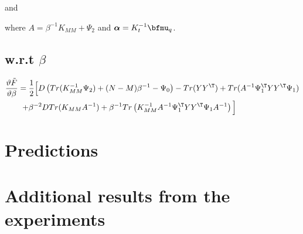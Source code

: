 and



\noindent where $A=\beta^{-1}K_{MM}+\Psi_2$ and $\boldsymbol \alpha = K_t^{-1} \bfmu_q$.

\subsection{w.r.t $\beta$}
\begin{align}
\frac{\vartheta \tilde{F}}{\vartheta \beta} ={}&
  \frac{1}{2} \Big[ 
      D \left( Tr(K_{MM}^{-1} \Psi_2) + (N-M)\beta^{-1} - \Psi_0 \right) - Tr(Y Y^\T)
	  + Tr(A^{-1}\Psi_1^\T Y Y^\T \Psi_1) \nonumber \\
   +{}& \beta^{-2} D Tr ( K_{MM} A^{-1} ) + \beta^{-1} Tr \left( K_{MM}^{-1} A^{-1} \Psi_1^\T Y Y^\T \Psi_1 A^{-1} \right) \Big]
\label{derivb2}
\end{align}




\section{Predictions}


\section{Additional results from the experiments}
